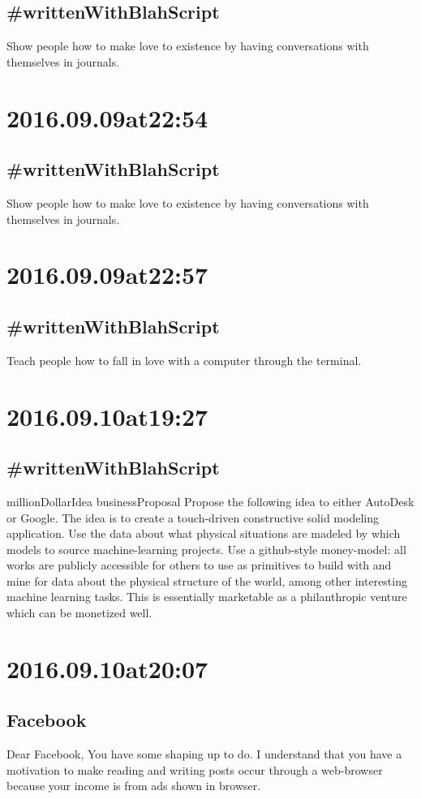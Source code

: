 \subsection*{\#writtenWithBlahScript }
Show people how to make love to existence by having conversations with themselves in journals.

\section*{ 2016.09.09at22:54 }
\subsection*{\#writtenWithBlahScript }
Show people how to make love to existence by having conversations with themselves in journals.

\section*{ 2016.09.09at22:57 }
\subsection*{\#writtenWithBlahScript }
Teach people how to fall in love with a computer through the terminal.

\section*{ 2016.09.10at19:27 }
\subsection*{\#writtenWithBlahScript }
millionDollarIdea businessProposal Propose the following idea to either AutoDesk or Google. The idea is to create a touch-driven constructive solid modeling application. Use the data about what physical situations are madeled by which models to source machine-learning projects. Use a github-style money-model: all works are publicly accessible for others to use as primitives to build with and mine for data about the physical structure of the world, among other interesting machine learning tasks. This is essentially marketable as a philanthropic venture which can be monetized well.

\section*{ 2016.09.10at20:07 }
\subsection*{ Facebook }
Dear Facebook,
You have some shaping up to do. I understand that you have a motivation to make reading and writing posts occur through a web-browser because your income is from ads shown in browser.

